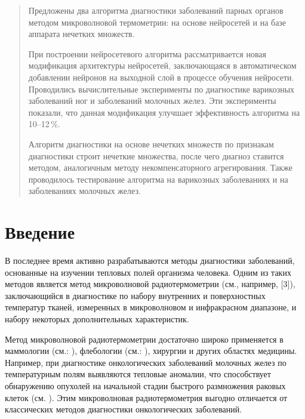 \begin{abstract} Предложены два алгоритма диагностики заболеваний парных органов методом микроволновой термометрии: на основе нейросетей и на базе аппарата нечетких множеств.

При построении нейросетевого алгоритма рассматривается новая модификация  архитектуры нейросетей, заключающаяся в автоматическом добавлении нейронов на выходной слой в процессе обучения нейросети.  Проводились вычислительные эксперименты по диагностике варикозных заболеваний ног и заболеваний молочных желез. Эти эксперименты показали, что данная модификация улучшает эффективность алгоритма на 10--12\,\%.

Алгоритм диагностики на основе нечетких множеств по признакам диагностики строит нечеткие множества, после чего диагноз ставится методом, аналогичным методу некомпенсаторного агрегирования. Также проводилось тестирование алгоритма на варикозных заболеваниях и на заболеваниях молочных желез.

\end{abstract}


\section*{Введение}



В последнее время активно разрабатываются методы 	 диагностики заболеваний, основанные на изучении тепловых полей организма человека. Одним из таких методов является метод микроволновой радиотермометрии (см., например, [3]), заключающийся в диагностике по набору внутренних и поверхностных температур тканей, измеренных  в микроволновом и инфракрасном диапазоне, и набору некоторых дополнительных характеристик.

Метод микроволновой радиотермометрии  достаточно широко применяется в маммологии (см.: \cite{vka1,los2,los3}), флебологии (см.: \cite{an1,los1,los4,los5}), хирургии и других областях медицины. Например, при диагностике онкологических заболеваний молочных желез по температурным полям выявляются тепловые аномалии, что способствует обнаружению опухолей на начальной стадии быстрого размножения раковых клеток (см. \cite{vka1}). Этим микроволновая радиотермометрия выгодно отличается от классических методов диагностики онкологических заболеваний.

